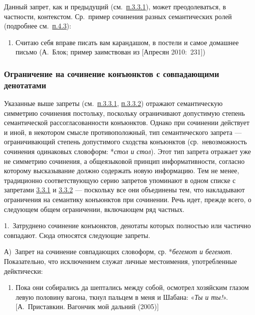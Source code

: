 Данный запрет, как и предыдущий (см.~\underline{п.3.3.1}), может
преодолеваться, в частности, контекстом. Ср.~пример сочинения разных
семантических ролей (подробнее см.~\underline{п.4.3}):

\begin{enumerate}
  \def\labelenumi{(\arabic{enumi})}
  \setcounter{enumi}{16}
  \item
        Считаю себя вправе писать вам карандашом, в постели и самое домашнее
        письмо (А.~Блок; пример заимствован из {[}Апресян 2010:~231{]})
\end{enumerate}

\subsubsection{Ограничение на сочинение конъюнктов с совпадающими
  денотатами}\label{ux43eux433ux440ux430ux43dux438ux447ux435ux43dux438ux435-ux43dux430-ux441ux43eux447ux438ux43dux435ux43dux438ux435-ux43aux43eux43dux44aux44eux43dux43aux442ux43eux432-ux441-ux441ux43eux432ux43fux430ux434ux430ux44eux449ux438ux43cux438-ux434ux435ux43dux43eux442ux430ux442ux430ux43cux438}

Указанные выше запреты (см.~\underline{п.3.3.1}, \underline{п.3.3.2})
отражают семантическую симметрию сочинения постольку, поскольку
ограничивают допустимую степень семантической рассогласованности
конъюнктов. Однако при сочинении действует и иной, в некотором смысле
противоположный, тип семантического запрета --- ограничивающий степень
допустимого сходства конъюнктов (ср.~невозможность сочинения одинаковых
словоформ: *\textit{стол и стол}). Этот тип запрета отражает уже не
симметрию сочинения, а общеязыковой принцип информативности, согласно
которому высказывание должно содержать новую информацию. Тем не менее,
традиционно соответствующую серию запретов упоминают в одном списке с
запретами \underline{3.3.1} и \underline{3.3.2} --- поскольку все они
объединены тем, что накладывают ограничения на семантику конъюнктов при
сочинении. Речь идет, прежде всего, о следующем общем ограничении,
включающем ряд частных.

1.~Затруднено сочинение конъюнктов, денотаты которых полностью или
частично совпадают. Сюда относятся следующие запреты.

А)~Запрет на сочинение совпадающих словоформ, ср. *\textit{бегемот и
  бегемот}. Показательно, что исключением служат личные местоимения,
употребленные дейктически:

\begin{enumerate}
  \def\labelenumi{(\arabic{enumi})}
  \setcounter{enumi}{17}
  \item
        Пока они собирались да шептались между собой, осмотрел хозяйским
        глазом левую половину вагона, ткнул пальцем в меня и Шабана: «\textit{Ты
          и ты!}». {[}А.~Приставкин. Вагончик мой дальний (2005){]}
\end{enumerate}

